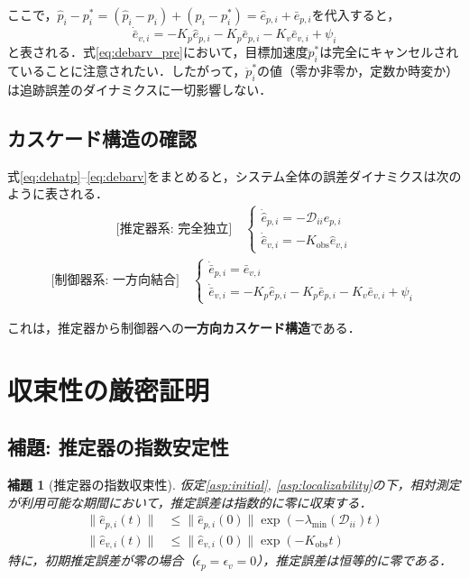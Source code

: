 \documentclass[a4paper]{jarticle}
\newtheorem{lemma}[theorem]{補題}
\theoremstyle{definition}
\theoremstyle{remark}
\numberwithin{equation}{section}
\begin{document}
	ここで，$\hat{p}_i - p_i^* = (\hat{p}_i - p_i) + (p_i - p_i^*) = \hat{e}_{p,i} + \bar{e}_{p,i}$を代入すると，
	\begin{equation}
		\dot{\bar{e}}_{v,i} = -K_p \hat{e}_{p,i} - K_p \bar{e}_{p,i} - K_v \bar{e}_{v,i} + \psi_i
		\label{eq:debarv}
	\end{equation}
	と表される．式\eqref{eq:debarv_pre}において，目標加速度$\ddot{p}_i^*$は完全にキャンセルされていることに注意されたい．したがって，$\ddot{p}_i^*$の値（零か非零か，定数か時変か）は追跡誤差のダイナミクスに一切影響しない．
	
	\subsection{カスケード構造の確認}
	
	式\eqref{eq:dehatp}--\eqref{eq:debarv}をまとめると，システム全体の誤差ダイナミクスは次のように表される．
	\begin{align}
		\text{[推定器系: 完全独立]} \quad
		\begin{cases}
			\dot{\hat{e}}_{p,i} = -\mathcal{D}_{ii} \hat{e}_{p,i} \\
			\dot{\hat{e}}_{v,i} = -K_{\mathrm{obs}} \hat{e}_{v,i}
		\end{cases}
		\label{eq:estimator_system}
	\end{align}
	\begin{align}
		\text{[制御器系: 一方向結合]} \quad
		\begin{cases}
			\dot{\bar{e}}_{p,i} = \bar{e}_{v,i} \\
			\dot{\bar{e}}_{v,i} = -K_p \hat{e}_{p,i} - K_p \bar{e}_{p,i} - K_v \bar{e}_{v,i} + \psi_i
		\end{cases}
		\label{eq:controller_system}
	\end{align}
	
	これは，推定器から制御器への\textbf{一方向カスケード構造}である．
	
	\section{収束性の厳密証明}
	\subsection{補題: 推定器の指数安定性}
	
	\begin{screen}
		\begin{lemma}[推定器の指数収束性]
			仮定\ref{asp:initial}, \ref{asp:localizability}の下，相対測定が利用可能な期間において，推定誤差は指数的に零に収束する．
			\begin{align}
				\|\hat{e}_{p,i}(t)\| &\le \|\hat{e}_{p,i}(0)\| \exp(-\lambda_{\min}(\mathcal{D}_{ii}) t) \label{eq:estimator_convergence_p}\\
				\|\hat{e}_{v,i}(t)\| &\le \|\hat{e}_{v,i}(0)\| \exp(-K_{\mathrm{obs}} t) \label{eq:estimator_convergence_v}
			\end{align}
			特に，初期推定誤差が零の場合（$\epsilon_p = \epsilon_v = 0$），推定誤差は恒等的に零である．
			\label{lem:estimator}
		\end{lemma}
	\end{screen}
	
\end{document}
